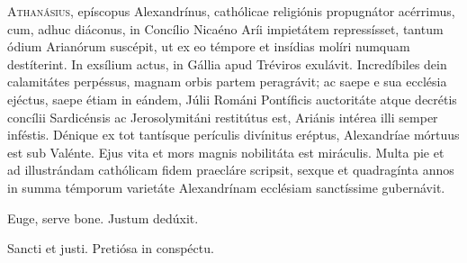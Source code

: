 

\lettrine{A}{thanásius,} epíscopus Alexandrínus,
cathólicae religiónis propugnátor acérrimus,
cum, adhuc diáconus, in Concílio Nicaéno Aríi impietátem repressísset,
tantum ódium Arianórum suscépit,
ut ex eo témpore et insídias molíri numquam destíterint.
In exsílium actus, in Gállia apud Tréviros exulávit.
Incredíbiles dein calamitátes perpéssus,
magnam orbis partem peragrávit;
ac saepe e sua ecclésia ejéctus, saepe étiam in eándem,
Júlii Románi Pontíficis auctoritáte atque decrétis concílii
Sardicénsis ac Jerosolymitáni restitútus est,
Ariánis intérea illi semper inféstis.
Dénique ex tot tantísque perículis divínitus eréptus,
Alexandríae mórtuus est sub Valénte.
Ejus vita et mors magnis nobilitáta est miráculis.
Multa pie et ad illustrándam cathólicam fidem praecláre scripsit,
sexque et quadragínta annos in summa témporum varietáte
Alexandrínam ecclésiam sanctíssime gubernávit.

\parsTeDeum

Euge, serve bone.
Justum dedúxit.

Sancti et justi.
Pretiósa in conspéctu.

